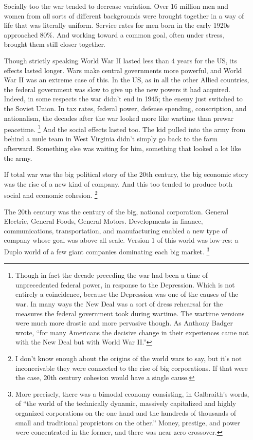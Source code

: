 \documentclass[12pt]{book}
\begin{document}
Socially too the war tended to decrease variation. Over 16 million men
and women from all sorts of different backgrounds were brought together
in a way of life that was literally uniform. Service rates for men born
in the early 1920s approached 80\%. And working toward a common goal,
often under stress, brought them still closer together.

Though strictly speaking World War II lasted less than 4 years for the
US, its effects lasted longer. Wars make central governments more
powerful, and World War II was an extreme case of this. In the US, as in
all the other Allied countries, the federal government was slow to give
up the new powers it had acquired. Indeed, in some respects the war
didn't end in 1945; the enemy just switched to the Soviet Union. In tax
rates, federal power, defense spending, conscription, and nationalism,
the decades after the war looked more like wartime than prewar
peacetime. \footnote{Though in fact the decade preceding the war had been a time of
unprecedented federal power, in response to the Depression. Which is not
entirely a coincidence, because the Depression was one of the causes of
the war. In many ways the New Deal was a sort of dress rehearsal for the
measures the federal government took during wartime. The wartime
versions were much more drastic and more pervasive though. As Anthony
Badger wrote, ``for many Americans the decisive change in their
experiences came not with the New Deal but with World War II.''} And the social effects lasted too.
The kid pulled into the army from behind a mule team in West Virginia
didn't simply go back to the farm afterward. Something else was waiting
for him, something that looked a lot like the army.

If total war was the big political story of the 20th century, the big
economic story was the rise of a new kind of company. And this too
tended to produce both social and economic cohesion.
\footnote{I don't know enough about the origins of the world wars to say,
but it's not inconceivable they were connected to the rise of big
corporations. If that were the case, 20th century cohesion would have a
single cause.}

The 20th century was the century of the big, national corporation.
General Electric, General Foods, General Motors. Developments in
finance, communications, transportation, and manufacturing enabled a new
type of company whose goal was above all scale. Version 1 of this world
was low-res: a Duplo world of a few giant companies dominating each big
market. \footnote{More precisely, there was a bimodal economy consisting, in
Galbraith's words, of ``the world of the technically dynamic, massively
capitalized and highly organized corporations on the one hand and the
hundreds of thousands of small and traditional proprietors on the
other.'' Money, prestige, and power were concentrated in the former, and
there was near zero crossover.}
\end{document}
